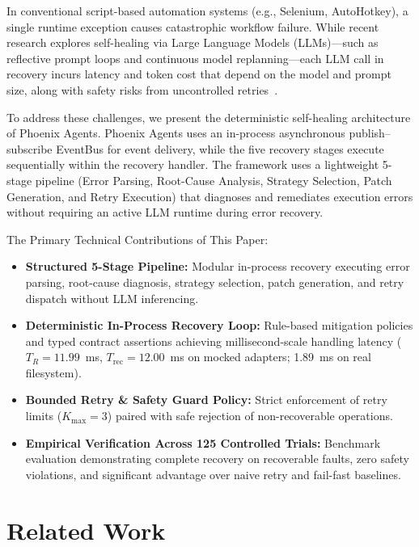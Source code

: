 \documentclass[conference]{IEEEtran}
\begin{document}
In conventional script-based automation systems (e.g., Selenium, AutoHotkey), a single runtime exception causes catastrophic workflow failure. While recent research explores self-healing via Large Language Models (LLMs)---such as reflective prompt loops and continuous model replanning---each LLM call in recovery incurs latency and token cost that depend on the model and prompt size, along with safety risks from uncontrolled retries~\cite{babu2026,jeong2026}.

To address these challenges, we present the deterministic self-healing architecture of Phoenix Agents. Phoenix Agents uses an in-process asynchronous publish--subscribe EventBus for event delivery, while the five recovery stages execute sequentially within the recovery handler. The framework uses a lightweight 5-stage pipeline (Error Parsing, Root-Cause Analysis, Strategy Selection, Patch Generation, and Retry Execution) that diagnoses and remediates execution errors without requiring an active LLM runtime during error recovery.

The Primary Technical Contributions of This Paper:
\begin{itemize}
    \item \textbf{Structured 5-Stage Pipeline:} Modular in-process recovery executing error parsing, root-cause diagnosis, strategy selection, patch generation, and retry dispatch without LLM inferencing.
    \item \textbf{Deterministic In-Process Recovery Loop:} Rule-based mitigation policies and typed contract assertions achieving millisecond-scale handling latency ($T_R = 11.99$~ms, $T_{\text{rec}} = 12.00$~ms on mocked adapters; 1.89~ms on real filesystem).
    \item \textbf{Bounded Retry \& Safety Guard Policy:} Strict enforcement of retry limits ($K_{\text{max}} = 3$) paired with safe rejection of non-recoverable operations.
    \item \textbf{Empirical Verification Across 125 Controlled Trials:} Benchmark evaluation demonstrating complete recovery on recoverable faults, zero safety violations, and significant advantage over naive retry and fail-fast baselines.
\end{itemize}

\section{Related Work}
\end{document}
